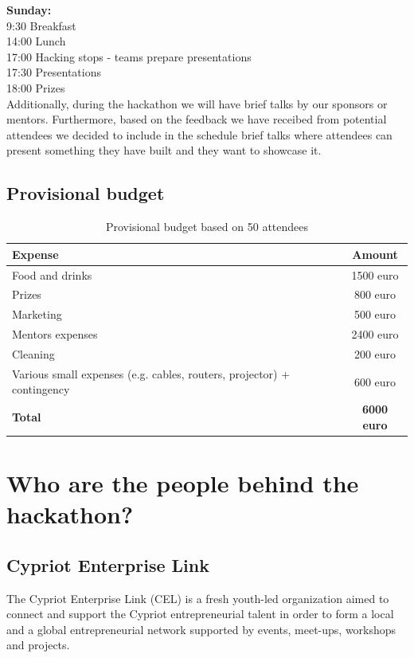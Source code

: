 \documentclass[a4paper,11pt]{report}
\begin{document}
\noindent\textbf{Sunday:}\\
9:30 Breakfast \\
14:00 Lunch\\
17:00 Hacking stops - teams prepare presentations\\
17:30 Presentations \\
18:00 Prizes\\

Additionally, during the hackathon we will have brief talks by our sponsors or mentors. Furthermore, based on the feedback we have receibed from potential attendees we decided to include in the schedule brief talks where attendees can present something they have built and they want to showcase it.

\section{Provisional budget}
\begin{table}[h]
\caption{Provisional budget based on 50 attendees} %
\centering %
\begin{tabular}{l c} %
\hline\hline                        %
Expense & Amount \\ [0.5ex]   
\hline            
Food and drinks  & 1500 euro\\ %
Prizes           & 800 euro\\
Marketing        & 500 euro\\
Mentors expenses & 2400 euro\\
Cleaning         & 200 euro\\
Various small expenses (e.g. cables, routers, projector)  + contingency & 600 euro\\
\hline 
\textbf{Total} & \textbf{6000 euro}\\
\hline
\end{tabular}
\end{table}

\chapter{Who are the people behind the hackathon?}

\section{Cypriot Enterprise Link}
The Cypriot Enterprise Link (CEL) is a fresh youth-led organization aimed to connect and support the Cypriot entrepreneurial talent in order to form a local and a global entrepreneurial network supported by events, meet-ups, workshops and projects. 
\end{document}

